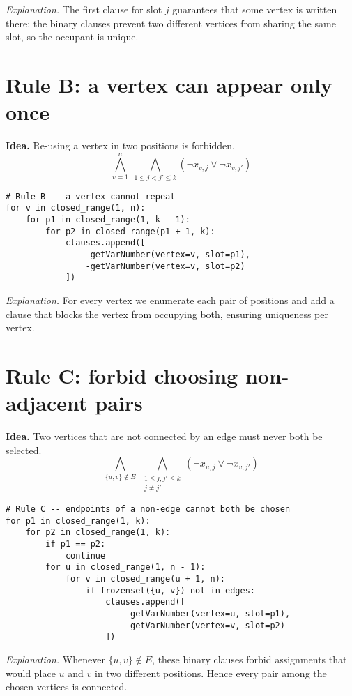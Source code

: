 \documentclass[11pt]{article}
\begin{document}
\textit{Explanation.} The first clause for slot $j$ guarantees that some vertex is written there; the binary clauses prevent two different vertices from sharing the same slot, so the occupant is unique.

\section*{Rule B: a vertex can appear only once}
\textbf{Idea.} Re-using a vertex in two positions is forbidden.
\[
\boxed{\,
  \bigwedge_{v=1}^{n}\;\bigwedge_{1\le j<j'\le k}
  (\lnot x_{v,j}\lor\lnot x_{v,j'})\,}
\]

\begin{lstlisting}[style=py]
# Rule B -- a vertex cannot repeat
for v in closed_range(1, n):
    for p1 in closed_range(1, k - 1):
        for p2 in closed_range(p1 + 1, k):
            clauses.append([
                -getVarNumber(vertex=v, slot=p1),
                -getVarNumber(vertex=v, slot=p2)
            ])
\end{lstlisting}

\textit{Explanation.} For every vertex we enumerate each pair of positions and add a clause that blocks the vertex from occupying both, ensuring uniqueness per vertex.

\section*{Rule C: forbid choosing non-adjacent pairs}
\textbf{Idea.} Two vertices that are not connected by an edge must never both be selected.
\[
\boxed{\,
  \bigwedge_{\{u,v\}\notin E}\;\bigwedge_{\substack{1\le j,j'\le k\\j\neq j'}}(\lnot x_{u,j}\lor\lnot x_{v,j'})\,}
\]

\begin{lstlisting}[style=py]
# Rule C -- endpoints of a non-edge cannot both be chosen
for p1 in closed_range(1, k):
    for p2 in closed_range(1, k):
        if p1 == p2:
            continue
        for u in closed_range(1, n - 1):
            for v in closed_range(u + 1, n):
                if frozenset({u, v}) not in edges:
                    clauses.append([
                        -getVarNumber(vertex=u, slot=p1),
                        -getVarNumber(vertex=v, slot=p2)
                    ])
\end{lstlisting}

\textit{Explanation.} Whenever $\{u,v\}\notin E$, these binary clauses forbid assignments that would place $u$ and $v$ in two different positions. Hence every pair among the chosen vertices is connected.
\end{document}
